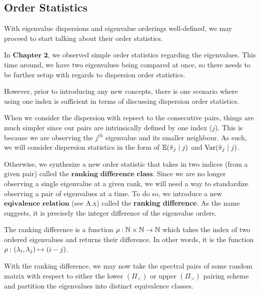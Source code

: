 \subsection{Order Statistics}
With eigenvalue dispersions and eigenvalue orderings well-defined, we may proceed to start talking about their order statistics.

In $\textbf{Chapter 2}$, we observed simple order statistics regarding the eigenvalues. This time around, we have two eigenvalues being compared at once, so there needs to be further setup with regards to dispersion order statistics.

However, prior to introducing any new concepts, there is one scenario where using one index is sufficient in terms of discussing dispersion order statistics.

\begin{remark}
When we consider the dispersion with repsect to the consecutive pairs, things are much simpler since our pairs are intrinsically defined by one index ($j$). This is because we are observing the $j^{th}$ eigenvalue and its smaller neighbour. As such, we will consider dispersion statistics in the form of $\mathbb{E}({\tilde{\pi}}_j \mid j)$ and $\text{Var}({\tilde{\pi}}_j \mid j)$.
\end{remark}

Otherwise, we synthesize a new order statistic that takes in two indices (from a given pair) called the $\textbf{ranking difference class}$. Since we are no longer observing a single eigenvalue at a given rank, we will need a way to standardize observing a pair of eigenvalues at a time. To do so, we introduce a new $\textbf{eqivalence relation}$ (see A.x) called the \textbf{ranking difference}. As the name suggests, it is precisely the integer difference of the eigenvalue orders.


\begin{definition}
The ranking difference is a function ${\rho}: \mathbb{N} \times \mathbb{N} \to \mathbb{N}$ which takes the index of two ordered eigenvalues and returns their difference. In other words, it is the function ${\rho}: (\lambda_i,\lambda_j) \mapsto (i - j)$.
\end{definition}

With the ranking difference, we may now take the spectral pairs of some random matrix with respect to either the lower $(\Pi_<)$ or upper $(\Pi_>)$ pairing scheme and partition the eigenvalues into distinct equivalence classes.

